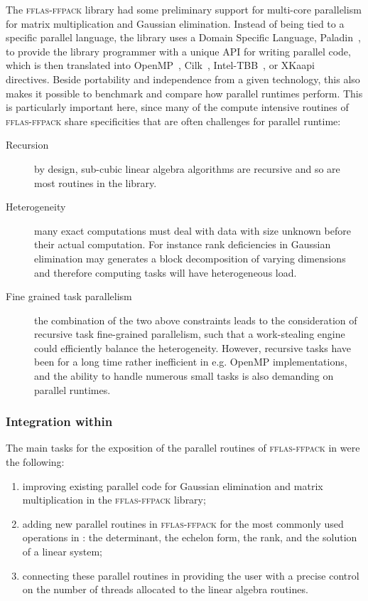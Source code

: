 \documentclass{deliverablereport}
\newcommand{\fflasffpack}{\textsc{fflas-ffpack}\xspace}
\begin{document}
The \fflasffpack library had some preliminary support for multi-core parallelism for matrix
multiplication and Gaussian elimination.
Instead of being tied to a specific parallel language, the library uses a Domain Specific Language, Paladin~\cite{paladin},
to provide the library programmer with a unique API for writing parallel code, which is then translated into 
OpenMP~\cite{openmp}, Cilk~\cite{cilk}, Intel-TBB~\cite{tbb}, or XKaapi~\cite{xkaapi} directives. Beside portability and
independence from
a given technology, this also makes it possible to benchmark and compare how parallel runtimes perform. This is
particularly important here, since many of the compute intensive routines of \fflasffpack share specificities that are
often challenges for parallel runtime:
\begin{description}
\item[Recursion] by design, sub-cubic linear algebra algorithms are recursive and so are most routines in the
  library.
\item[Heterogeneity] many exact computations must deal with data with size unknown before their actual computation. For
  instance rank deficiencies in Gaussian elimination may generates a block decomposition of varying dimensions and
  therefore computing tasks will have heterogeneous load.
\item[Fine grained task parallelism] the combination of the two above constraints leads to the consideration of recursive task
  fine-grained parallelism, such that a work-stealing engine could efficiently balance the heterogeneity. However,
  recursive tasks have been for a long time rather inefficient in e.g. OpenMP implementations, and the ability to handle
  numerous small tasks is also demanding on parallel runtimes.
\end{description}

\subsubsection{Integration within \SageMath}

The main tasks for the exposition of the parallel routines of \fflasffpack in \SageMath were the following:
\begin{enumerate}
\item improving existing parallel code for Gaussian elimination and matrix multiplication in the \fflasffpack library;
\item adding new parallel routines in \fflasffpack for the most commonly used operations in \SageMath: the determinant,
  the echelon form, the rank, and the solution of a linear system;
\item connecting these parallel routines in \SageMath  providing  the user
  with a precise control on the number of threads allocated to the linear algebra routines. 
\end{enumerate}
\end{document}
